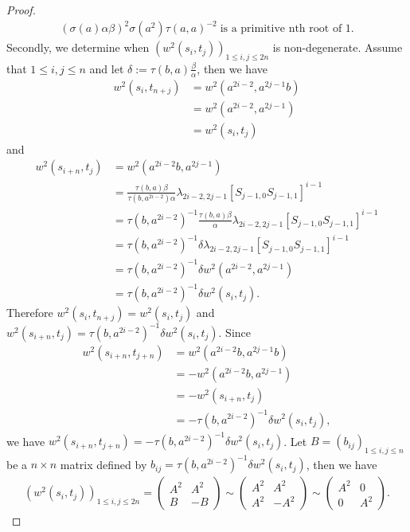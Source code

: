 \documentclass[a4paper,11pt]{amsart}
\numberwithin{equation}{section}
\begin{document}
\begin{proof}
\begin{gather}
\label{non-deg-w1}(\sigma(a) \alpha \beta)^2 \sigma(a^2) \tau(a,a)^{-2} \;\text{is a primitive nth root of 1.}
\end{gather}
Secondly, we determine when $(w^2(s_i,t_j))_{1\leq i,j \leq 2n}$ is non-degenerate. Assume that $1\leq i,j \leq n$ and let $\delta:=\tau(b,a)\frac{\beta}{\alpha}$, then we have
\begin{align*}
w^2(s_{i},t_{n+j})&=w^2(a^{2i-2},a^{2j-1}b)\\
&=w^2(a^{2i-2},a^{2j-1}) \\
&=w^2(s_{i},t_{j})
\end{align*}
and
\begin{align*}
w^2(s_{i+n},t_{j})&=w^2(a^{2i-2}b,a^{2j-1})\\
&=\frac{\tau(b,a) \beta}{ \tau(b,a^{2i-2}) \alpha} \lambda_{2i-2,2j-1} [S_{j-1,0} S_{j-1,1}]^{i-1}\\
&=\tau(b,a^{2i-2})^{-1} \frac{\tau(b,a) \beta}{\alpha} \lambda_{2i-2,2j-1} [S_{j-1,0} S_{j-1,1}]^{i-1}\\
&=\tau(b,a^{2i-2})^{-1} \delta \lambda_{2i-2,2j-1} [S_{j-1,0} S_{j-1,1}]^{i-1}\\
&=\tau(b,a^{2i-2})^{-1} \delta w^2(a^{2i-2},a^{2j-1})\\
&=\tau(b,a^{2i-2})^{-1} \delta w^2(s_i,t_j).
\end{align*}
Therefore  $w^2(s_{i},t_{n+j})=w^2(s_{i},t_{j})$ and $w^2(s_{i+n},t_{j})=\tau(b,a^{2i-2})^{-1} \delta w^2(s_i,t_j)$. Since
\begin{align*}
w^2(s_{i+n},t_{j+n})&=w^2(a^{2i-2}b,a^{2j-1}b)\\
&=-w^2(a^{2i-2}b,a^{2j-1})\\
&=-w^2(s_{i+n},t_{j})\\
&=-\tau(b,a^{2i-2})^{-1} \delta w^2(s_i,t_j),
\end{align*}
we have $w^2(s_{i+n},t_{j+n})=-\tau(b,a^{2i-2})^{-1} \delta w^2(s_i,t_j)$. Let $B=(b_{ij})_{1\leq i,j \leq n}$ be a $n\times n$ matrix defined by $b_{ij}=\tau(b,a^{2i-2})^{-1} \delta w^2(s_i,t_j)$, then we have
\begin{gather*}
(w^2(s_i,t_j))_{1\leq i,j \leq 2n} = \begin{pmatrix} A^2 & A^2 \\ B & -B \end{pmatrix} \sim \begin{pmatrix} A^2 & A^2 \\ A^2 & -A^2 \end{pmatrix} \sim \begin{pmatrix} A^2 & 0 \\ 0 & A^2 \end{pmatrix}.

\end{gather*}
\end{proof}
\end{document}
